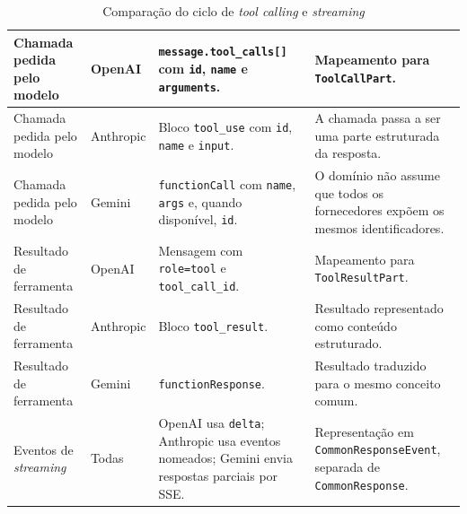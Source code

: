 \documentclass[11pt,a4paper]{report}
\begin{document}
\begin{table}[H]
\begin{tabularx}{\textwidth}{|>{\raggedright\arraybackslash}p{2.4cm}|>{\raggedright\arraybackslash}p{1.8cm}|Y|Y|}
            \hline
            Chamada pedida pelo modelo & OpenAI & \texttt{message.tool\_calls[]} com \texttt{id}, \texttt{name} e \texttt{arguments}. & Mapeamento para \texttt{ToolCallPart}. \\
            \hline
            Chamada pedida pelo modelo & Anthropic & Bloco \texttt{tool\_use} com \texttt{id}, \texttt{name} e \texttt{input}. & A chamada passa a ser uma parte estruturada da resposta. \\
            \hline
            Chamada pedida pelo modelo & Gemini & \texttt{functionCall} com \texttt{name}, \texttt{args} e, quando disponível, \texttt{id}. & O domínio não assume que todos os fornecedores expõem os mesmos identificadores. \\
            \hline
            Resultado de ferramenta & OpenAI & Mensagem com \texttt{role=tool} e \texttt{tool\_call\_id}. & Mapeamento para \texttt{ToolResultPart}. \\
            \hline
            Resultado de ferramenta & Anthropic & Bloco \texttt{tool\_result}. & Resultado representado como conteúdo estruturado. \\
            \hline
            Resultado de ferramenta & Gemini & \texttt{functionResponse}. & Resultado traduzido para o mesmo conceito comum. \\
            \hline
            Eventos de \textit{streaming} & Todas & OpenAI usa \texttt{delta}; Anthropic usa eventos nomeados; Gemini envia respostas parciais por SSE. & Representação em \texttt{CommonResponseEvent}, separada de \texttt{CommonResponse}. \\
            \hline
        \end{tabularx}
        \caption{Comparação do ciclo de \textit{tool calling} e \textit{streaming}}
        \label{tab:tool-stream-mapping}
    \end{table}
\end{document}
